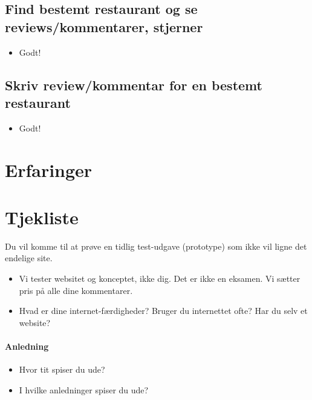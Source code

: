 \documentclass[a4paper, 12pt]{article}
\begin{document}
\subsection{Find bestemt restaurant og se reviews/kommentarer, stjerner}
\begin{itemize}
\item Godt! 
\end{itemize}

\subsection{Skriv review/kommentar for en bestemt restaurant}
\begin{itemize}
\item Godt! 
\end{itemize}


\section{Erfaringer}
\label{sec:Erfaringer}

\clearpage
\appendix

\section{Tjekliste}

Du vil komme til at prøve en tidlig test-udgave (prototype) som ikke vil ligne
det endelige site.
\begin{itemize}
\item Vi tester websitet og konceptet, ikke dig. Det er ikke en
  eksamen. Vi sætter pris på alle dine kommentarer.
\item Hvad er dine internet-færdigheder? Bruger du internettet ofte?
  Har du selv et website?
\end{itemize}

\paragraph{Anledning}
\begin{itemize}
\item Hvor tit spiser du ude?
\item I hvilke anledninger spiser du ude?
\end{itemize}
\end{document}
